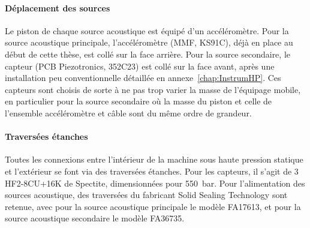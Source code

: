 \paragraph{Déplacement des sources} Le piston de chaque source acoustique est équipé d'un accéléromètre. Pour la source acoustique principale, l'accéléromètre (MMF, KS91C), déjà en place au début de cette thèse, est collé sur la face arrière. Pour la source secondaire, le capteur (PCB Piezotronics, 352C23) est collé sur la face avant, après une installation peu conventionnelle détaillée en annexe~\ref{chap:InstrumHP}. Ces capteurs sont choisis de sorte à ne pas trop varier la masse de l'équipage mobile, en particulier pour la source secondaire où la masse du piston et celle de l'ensemble accéléromètre et câble sont du même ordre de grandeur.

\paragraph{Traversées étanches} Toutes les connexions entre l'intérieur de la machine sous haute pression statique et l'extérieur se font via des traversées étanches. Pour les capteurs, il s'agit de 3 HF2-8CU+16K de Spectite, dimensionnées pour \qty{550}{\bar}. Pour l'alimentation des sources acoustique, des traversées du fabricant Solid Sealing Technology sont retenue, avec pour la source acoustique principale le modèle FA17613, et pour la source acoustique secondaire le modèle FA36735.



%    

